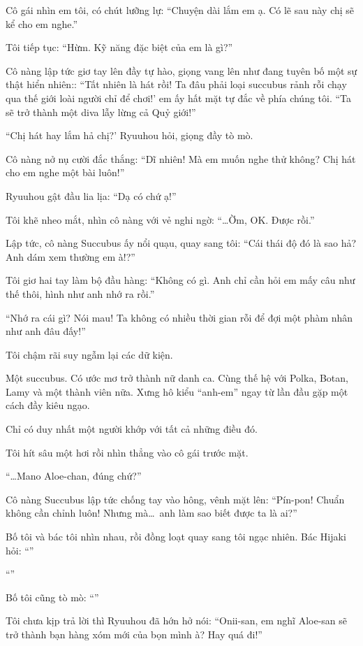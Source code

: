 \documentclass[../main.tex]{subfiles}
\begin{document}
Cô gái nhìn em tôi, có chút lưỡng lự: ``Chuyện dài lắm em ạ. Có lẽ sau này chị sẽ kể cho em nghe.''

Tôi tiếp tục: ``Hừm. Kỹ năng đặc biệt của em là gì?''

Cô nàng lập tức giơ tay lên đầy tự hào, giọng vang lên như đang tuyên bố một sự thật hiển nhiên:: ``Tất nhiên là hát rồi! Ta đâu phải loại succubus rảnh rỗi chạy qua thế giới loài người chỉ để chơi!' em ấy hất mặt tự đắc về phía chúng tôi. ``Ta sẽ trở thành một diva lẫy lừng cả Quỷ giới!''

``Chị hát hay lắm hả chị?' Ryuuhou hỏi, giọng đầy tò mò.

Cô nàng nở nụ cười đắc thắng: ``Dĩ nhiên! Mà em muốn nghe thử không? Chị hát cho em nghe một bài luôn!''

Ryuuhou gật đầu lia lịa: ``Dạ có chứ ạ!''

Tôi khẽ nheo mắt, nhìn cô nàng với vẻ nghi ngờ: ``\dots Ờm, OK. Được rồi.''

Lập tức, cô nàng Succubus ấy nổi quạu, quay sang tôi: ``Cái thái độ đó là sao hả? Anh dám xem thường em à!?''

Tôi giơ hai tay làm bộ đầu hàng: ``Không có gì. Anh chỉ cần hỏi em mấy câu như thế thôi, hình như anh nhớ ra rồi.''

``Nhớ ra cái gì? Nói mau! Ta không có nhiều thời gian rỗi để đợi một phàm nhân như anh đâu đấy!''

Tôi chậm rãi suy ngẫm lại các dữ kiện.

Một succubus. Có ước mơ trở thành nữ danh ca. Cùng thế hệ với Polka, Botan, Lamy và một thành viên nữa. Xưng hô kiểu ``anh-em'' ngay từ lần đầu gặp một cách đầy kiêu ngạo.

Chỉ có duy nhất một người khớp với tất cả những điều đó.

Tôi hít sâu một hơi rồi nhìn thẳng vào cô gái trước mặt.

``\dots Mano Aloe-chan, đúng chứ?''

Cô nàng Succubus lập tức chống tay vào hông, vênh mặt lên: ``Pín-pon! Chuẩn không cần chỉnh luôn! Nhưng mà\dots\ anh làm sao biết được ta là ai?''

Bố tôi và bác tôi nhìn nhau, rồi đồng loạt quay sang tôi ngạc nhiên. Bác Hijaki hỏi: ``''

``''

Bố tôi cũng tò mò: ``''

Tôi chưa kịp trả lời thì Ryuuhou đã hớn hở nói: ``Onii-san, em nghĩ Aloe-san sẽ trở thành bạn hàng xóm mới của bọn mình à? Hay quá đi!''
\end{document}
